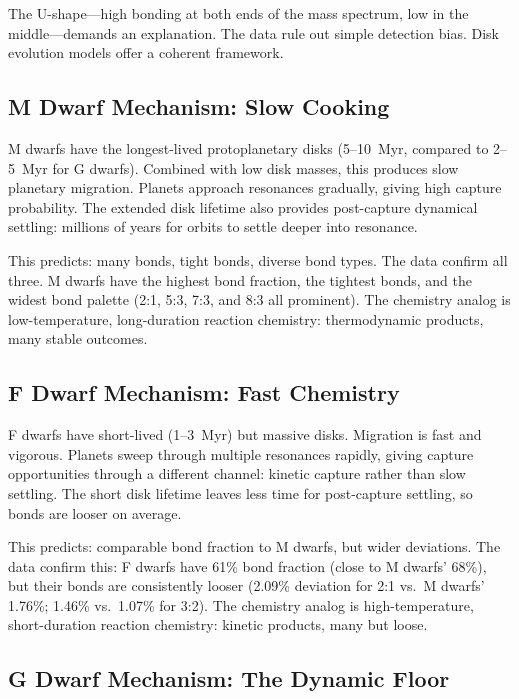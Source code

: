 \documentclass[twocolumn]{aastex631}
\begin{document}
The U-shape---high bonding at both ends of the mass spectrum, low in the
middle---demands an explanation. The data rule out simple detection bias.
Disk evolution models offer a coherent framework.

\subsection{M Dwarf Mechanism: Slow Cooking}

M dwarfs have the longest-lived protoplanetary disks (5--10~Myr, compared to
2--5~Myr for G dwarfs)\citep{yasui2010,haisch2001}. Combined with low disk
masses, this produces slow planetary migration. Planets approach resonances
gradually, giving high capture probability. The extended disk lifetime also
provides post-capture dynamical settling: millions of years for orbits to settle
deeper into resonance.

This predicts: many bonds, tight bonds, diverse bond types. The data confirm
all three. M dwarfs have the highest bond fraction, the tightest bonds, and the
widest bond palette (2:1, 5:3, 7:3, and 8:3 all prominent). The chemistry
analog is low-temperature, long-duration reaction chemistry: thermodynamic
products, many stable outcomes.

\subsection{F Dwarf Mechanism: Fast Chemistry}

F dwarfs have short-lived (1--3~Myr) but massive disks\citep{sicilia_aguilar}.
Migration is fast and vigorous. Planets sweep through multiple resonances
rapidly, giving capture opportunities through a different channel: kinetic
capture rather than slow settling. The short disk lifetime leaves less time for
post-capture settling, so bonds are looser on average.

This predicts: comparable bond fraction to M dwarfs, but wider deviations. The
data confirm this: F dwarfs have 61\% bond fraction (close to M dwarfs' 68\%),
but their bonds are consistently looser (2.09\% deviation for 2:1 vs.\ M dwarfs'
1.76\%; 1.46\% vs.\ 1.07\% for 3:2). The chemistry analog is
high-temperature, short-duration reaction chemistry: kinetic products, many but
loose.

\subsection{G Dwarf Mechanism: The Dynamic Floor}
\end{document}
